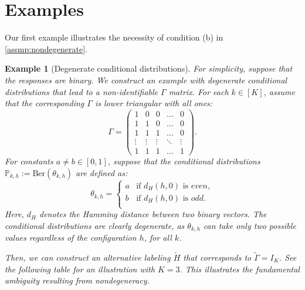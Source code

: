 \documentclass[10pt]{article} %
\newtheorem{example}{Example}
\newcommand{\PP}{\mathbb P}
\def\tilde{\widetilde}
\begin{document}
\section{Examples}\label{sec:counterex}
Our first example illustrates the necessity of condition (b) in \cref{assmp:nondegenerate}.
\begin{example}[Degenerate conditional distributions]\label{ex:degenerate}
    For simplicity, suppose that the responses are binary. We construct an example with degenerate conditional distributions that lead to a non-identifiable $\Gamma$ matrix.
    For each $k \in [K]$, assume that the corresponding $\Gamma$ is lower triangular with all ones:
    $$\Gamma = \begin{pmatrix}
        1 & 0 & 0 & \ldots & 0 \\
        1 & 1 & 0 & \ldots & 0 \\
        1 & 1 & 1 & \ldots & 0 \\
        \vdots & \vdots & \vdots & \ddots & \vdots \\
        1 & 1 & 1 & \ldots & 1
    \end{pmatrix}.$$
    For constants $a \neq b \in [0,1]$, suppose that the conditional distributions $\PP_{k,h} := \text{Ber}(\theta_{k,h})$ are defined as:
    $$\theta_{k,h} = \begin{cases}
        a & \text{if } d_H(h, 0) \text{ is } even, \\
        b & \text{if } d_H(h, 0) \text{ is } odd. \\
    \end{cases}$$
    Here, $d_H$ denotes the Hamming distance between two binary vectors. The conditional distributions are clearly degenerate, as $\theta_{k,h}$ can take only two possible values regardless of the configuration $h$, for all $k$. 

    Then, we can construct an alternative labeling $\tilde{H}$ that corresponds to $\tilde{\Gamma} = I_K$. See the following table for an illustration with $K=3$. This illustrates the fundamental ambiguity resulting from nondegeneracy. 
    

\end{example}
\end{document}
